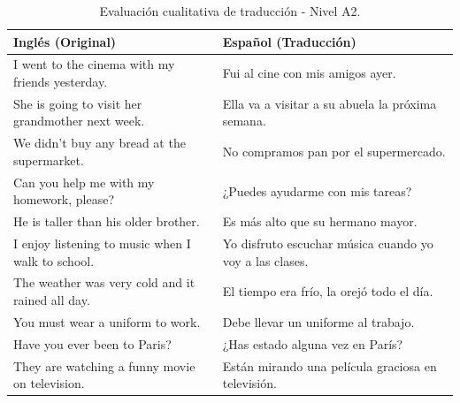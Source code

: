 \begin{table}[t]
    \centering
    \begin{tabular}{p{} p{}}
        \toprule
        \textbf{Inglés (Original)} & \textbf{Español (Traducción)} \\
        \midrule
        I went to the cinema with my friends yesterday. & Fui al cine con mis amigos ayer. \\
        She is going to visit her grandmother next week. & Ella va a visitar a su abuela la próxima semana. \\
        We didn't buy any bread at the supermarket. & No compramos pan por el supermercado. \\
        Can you help me with my homework, please? & ¿Puedes ayudarme con mis tareas? \\
        He is taller than his older brother. & Es más alto que su hermano mayor. \\
        I enjoy listening to music when I walk to school. & Yo disfruto escuchar música cuando yo voy a las clases. \\
        The weather was very cold and it rained all day. & El tiempo era frío, la orejó todo el día. \\
        You must wear a uniform to work. & Debe llevar un uniforme al trabajo. \\
        Have you ever been to Paris? & ¿Has estado alguna vez en París? \\
        They are watching a funny movie on television. & Están mirando una película graciosa en televisión. \\
        \bottomrule
    \end{tabular}
    \caption{Evaluación cualitativa de traducción - Nivel A2.}
    \label{tab:evaluacion_A2}
\end{table}

